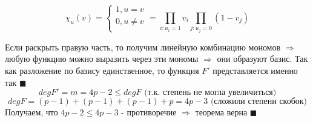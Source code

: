 $$\chi_u(v)=\left\{
\begin{array}{ccc}
1, u=v\\
0, u \neq v\\
\end{array}
\right. = \prod\limits_{i:u_i=1} v_i \prod\limits_{j:u_j=0} (1-v_j)$$
\par Если раскрыть правую часть, то получим линейную комбинацию мономов $\Rightarrow$ любую функцию можно выразить через эти мономы $\Rightarrow$ они образуют базис. Так как разложение по базису единственное, то функция $F'$ представляется именно так $\blacksquare$
$$deg F'=m=4p-2 \leq deg F \mbox{ (т.к. степень не могла увеличиться)}$$
$$deg F = (p-1)+(p-1)+(p-1)+p=4p-3 \mbox{ (сложили степени скобок)}$$
Получаем, что $4p-2 \leq 4p-3$ - противоречие $\Rightarrow$ теорема верна $\blacksquare$